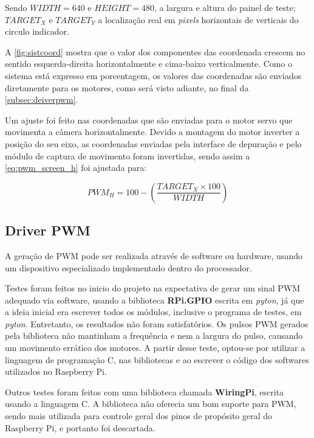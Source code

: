 Sendo $WIDTH = 640$ e $HEIGHT = 480$, a largura e altura do painel de teste; $TARGET_X$ e $TARGET_Y$ a localização real em \textit{pixels} horizontais de verticais do circulo indicador.

A \autoref{fig:sistcoord} mostra que o valor dos componentes das coordenada crescem no sentido esquerda-direita horizontalmente e cima-baixo verticalmente. Como o sistema está expresso em porcentagem, os valores das coordenadas são enviados diretamente para os motores, como será visto adiante, no final da \autoref{subsec:deiverpwm}.\par

Um ajuste foi feito nas coordenadas que são enviadas para o motor servo que movimenta a câmera horizontalmente. Devido a montagem do motor inverter a posição do seu eixo, as coordenadas enviadas pela interface de depuração e pelo módulo de captura de movimento foram invertidas, sendo assim a \autoref{eq:pwm_screen_h} foi ajustada para:

\begin{equation}
	PWM_H = 100 - (\frac{TARGET_X \times 100}{WIDTH})
	\label{eq:pwm_screen_h_inverse}
\end{equation}

\subsection{Driver PWM}
\label{subsec:deiverpwm}

A geração de PWM pode ser realizada através de software ou hardware, usando um dispositivo especializado implementado dentro do processador.\par

Testes foram feitos no inicio do projeto na expectativa de gerar um sinal PWM adequado via software, usando a biblioteca \textbf{RPi.GPIO} escrita em \textit{pyton}, já que a ideia inicial era escrever todos os módulos, inclusive o programa de testes, em \textit{pyton}. Entretanto, os resultados não foram satisfatórios. Os pulsos PWM gerados pela biblioteca não mantinham a frequência e nem a largura do pulso, causando um movimento errático dos motores. A partir desse teste, optou-se por utilizar a linguagem de programação C, nas bibliotecas e ao escrever o código dos softwares utilizados no Raspberry Pi.\par

Outros testes foram feitos com uma biblioteca chamada \textbf{WiringPi}, escrita usando a linguagem C. A biblioteca não oferecia um bom suporte para PWM, sendo mais utilizada para controle geral dos pinos de propósito geral do Raspberry Pi, e portanto foi descartada.\par

